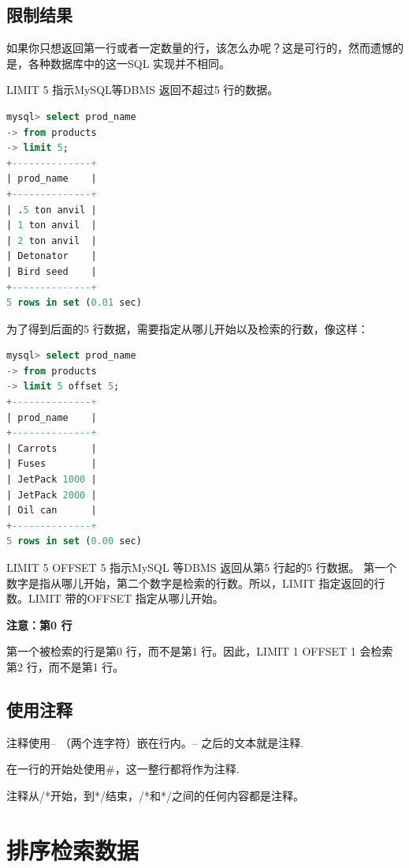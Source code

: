 \documentclass[11pt,a4paper,oneside]{book}
\begin{document}
\section{限制结果}
如果你只想返回第一行或者一定数量的行，该怎么办呢？这是可行的，然而遗憾的是，各种数据库中的这一SQL 实现并不相同。

LIMIT 5 指示MySQL等DBMS 返回不超过5 行的数据。
\begin{lstlisting}[language=sql]
mysql> select prod_name
-> from products
-> limit 5;
+--------------+
| prod_name    |
+--------------+
| .5 ton anvil |
| 1 ton anvil  |
| 2 ton anvil  |
| Detonator    |
| Bird seed    |
+--------------+
5 rows in set (0.01 sec)
\end{lstlisting}

为了得到后面的5 行数据，需要指定从哪儿开始以及检索的行数，像这样：
\begin{lstlisting}[language=sql]
mysql> select prod_name
-> from products
-> limit 5 offset 5;
+--------------+
| prod_name    |
+--------------+
| Carrots      |
| Fuses        |
| JetPack 1000 |
| JetPack 2000 |
| Oil can      |
+--------------+
5 rows in set (0.00 sec)
\end{lstlisting}
LIMIT 5 OFFSET 5 指示MySQL 等DBMS 返回从第5 行起的5 行数据。
第一个数字是指从哪儿开始，第二个数字是检索的行数。所以，LIMIT 指定返回的行数。LIMIT 带的OFFSET 指定从哪儿开始。

\begin{tcolorbox}[colback=pink!10!white,colframe=pink!100!black]
\textbf{注意：第0 行}

第一个被检索的行是第0 行，而不是第1 行。因此，LIMIT 1 OFFSET
1 会检索第2 行，而不是第1 行。
\end{tcolorbox}

\section{使用注释}
注释使用-- （两个连字符）嵌在行内。-- 之后的文本就是注释.

在一行的开始处使用\#，这一整行都将作为注释.

注释从/*开始，到*/结束，/*和*/之间的任何内容都是注释。

\chapter{排序检索数据}
\end{document}
